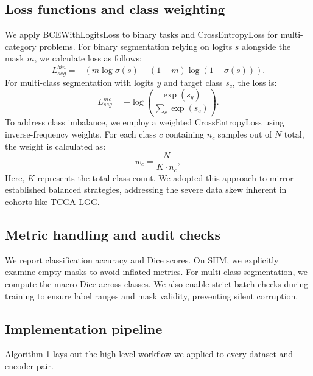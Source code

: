 \documentclass[conference,a4paper]{IEEEtran}
\begin{document}
\subsection{Loss functions and class weighting}
We apply BCEWithLogitsLoss to binary tasks and CrossEntropyLoss for multi-category problems. For binary segmentation relying on logits $s$ alongside the mask $m$, we calculate loss as follows:
\begin{equation}
L_{seg}^{bin} = - \left(m \log \sigma(s) + (1 - m) \log (1 - \sigma(s))\right).
\end{equation}
For multi-class segmentation with logits $y$ and target class $s_c$, the loss is:
\begin{equation}
L_{seg}^{mc} = -\log\left(\frac{\exp(s_y)}{\sum_c \exp(s_c)}\right).
\end{equation}
To address class imbalance, we employ a weighted CrossEntropyLoss using inverse-frequency weights. For each class $c$ containing $n_c$ samples out of $N$ total, the weight is calculated as:
\begin{equation}
w_c = \frac{N}{K \cdot n_c},
\end{equation}
Here, $K$ represents the total class count. We adopted this approach to mirror established balanced strategies, addressing the severe data skew inherent in cohorts like TCGA-LGG.

\subsection{Metric handling and audit checks}
We report classification accuracy and Dice scores. On SIIM, we explicitly examine empty masks to avoid inflated metrics. For multi-class segmentation, we compute the macro Dice across classes. We also enable strict batch checks during training to ensure label ranges and mask validity, preventing silent corruption.

\subsection{Implementation pipeline}
Algorithm 1 lays out the high-level workflow we applied to every dataset and encoder pair.
\end{document}
